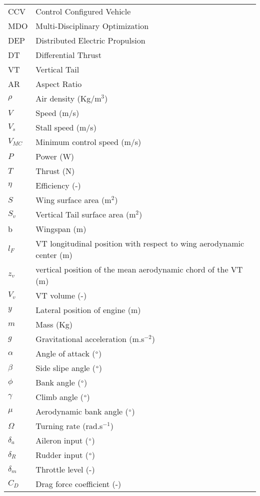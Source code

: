 \documentclass[conf]{new-aiaa} %
\begin{document}
{\renewcommand\arraystretch{1.0}
\noindent\begin{longtable*}{@{}l @{\quad=\quad} l@{}}
CCV & Control Configured Vehicle\\
MDO & Multi-Disciplinary Optimization\\
DEP & Distributed Electric Propulsion\\
DT & Differential Thrust\\
VT & Vertical Tail\\
AR & Aspect Ratio\\
$\rho$ & Air density (Kg/m$^3$)\\
$V$ & Speed (m/s)\\
$V_s$ & Stall speed (m/s)\\
$V_{MC}$ & Minimum control speed (m/s)\\
$P$ & Power (W)\\
$T$ & Thrust (N)\\
$\eta$ & Efficiency (-)\\
$S$ & Wing surface area (m$^2$)\\
$S_v$ & Vertical Tail surface area (m$^2$)\\
b & Wingspan (m)\\
$l_F$ & VT longitudinal position with respect to wing aerodynamic center (m)\\
$z_v$ & vertical position of the mean aerodynamic chord of the VT (m)\\
$V_v$ & VT volume (-)\\
$y$ & Lateral position of engine (m)\\
$m$ & Mass (Kg)\\
$g$ & Gravitational acceleration (m.s$^{-2}$)\\
$\alpha$ & Angle of attack ($\SIUnitSymbolDegree$)\\
$\beta$ & Side slipe angle ($\SIUnitSymbolDegree$)\\
$\phi$ & Bank angle ($\SIUnitSymbolDegree$)\\
$\gamma$ & Climb angle ($\SIUnitSymbolDegree$)\\
$\mu$ & Aerodynamic bank angle ($\SIUnitSymbolDegree$)\\
$\Omega$ & Turning rate (rad.s$^{-1}$)\\
$\delta_a$ & Aileron input ($\SIUnitSymbolDegree$)\\
$\delta_R$ & Rudder input ($\SIUnitSymbolDegree$)\\
$\delta_m$ & Throttle level (-)\\
$C_D$ & Drag force coefficient (-)\\

\end{longtable*}}
\end{document}
